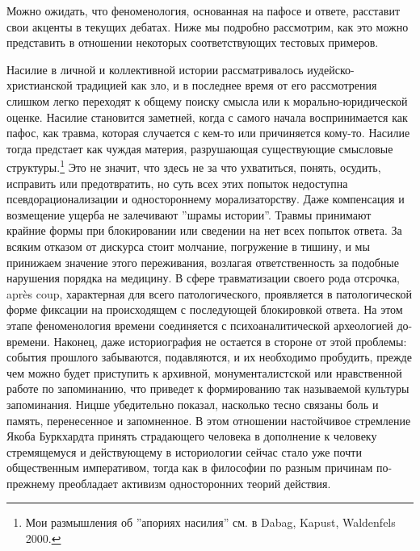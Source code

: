 \documentclass[12pt]{book}
\begin{document}
Можно ожидать, что феноменология, основанная на пафосе и ответе, расставит свои акценты в текущих дебатах. Ниже мы подробно рассмотрим, как это можно представить в отношении некоторых соответствующих тестовых примеров.

Насилие в личной и коллективной истории рассматривалось иудейско-христианской традицией как зло, и в последнее время от его рассмотрения слишком легко переходят к общему поиску смысла или к морально-юридической оценке. Насилие становится заметней, когда с самого начала воспринимается как пафос, как травма, которая случается с кем-то или причиняется кому-то. Насилие тогда предстает как чуждая материя, разрушающая существующие смысловые структуры.\footnote{Мои размышления об ''апориях насилия'' см. в Dabag, Kapust, Waldenfels 2000.} Это не значит, что здесь не за что ухватиться, понять, осудить, исправить или предотвратить, но суть всех этих попыток недоступна псевдорационализации и одностороннему морализаторству. Даже компенсация и возмещение ущерба не залечивают ''шрамы истории''. Травмы принимают крайние формы при блокировании или сведении на нет всех попыток ответа. За всяким отказом от дискурса стоит молчание, погружение в тишину, и мы принижаем значение этого переживания, возлагая ответственность за подобные нарушения порядка на медицину. В сфере травматизации своего рода отсрочка, après coup, характерная для всего патологического, проявляется в патологической форме фиксации на происходящем с последующей блокировкой ответа. На этом этапе феноменология времени соединяется с психоаналитической археологией до-времени. Наконец, даже историография не остается в стороне от этой проблемы: события прошлого забываются, подавляются, и их необходимо пробудить, прежде чем можно будет приступить к архивной, монументалистской или нравственной работе по запоминанию, что приведет к формированию так называемой культуры запоминания. Ницше убедительно показал, насколько тесно связаны боль и память, перенесенное и запомненное. В этом отношении настойчивое стремление Якоба Буркхардта принять страдающего человека в дополнение к человеку стремящемуся и действующему в историологии сейчас стало уже почти общественным императивом, тогда как в философии по разным причинам по-прежнему преобладает активизм односторонних теорий действия.
\end{document}
